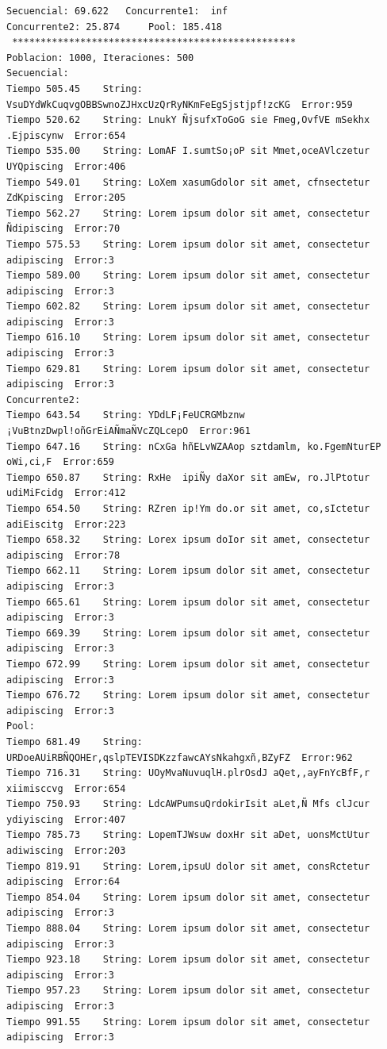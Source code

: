 \documentclass[a4paper,twocolumn,10pt]{article}
\begin{document}
\begin{center}
{\begin{verbatim}
Secuencial: 69.622	 Concurrente1:  inf
Concurrente2: 25.874	 Pool: 185.418 
 **************************************************
Poblacion: 1000, Iteraciones: 500
Secuencial:
Tiempo 505.45	 String: VsuDYdWkCuqvgOBBSwnoZJHxcUzQrRyNKmFeEgSjstjpf!zcKG	 Error:959
Tiempo 520.62	 String: LnukY ÑjsufxToGoG sie Fmeg,OvfVE mSekhx .Ejpiscynw	 Error:654
Tiempo 535.00	 String: LomAF I.sumtSo¡oP sit Mmet,oceAVlczetur UYQpiscing	 Error:406
Tiempo 549.01	 String: LoXem xasumGdolor sit amet, cfnsectetur ZdKpiscing	 Error:205
Tiempo 562.27	 String: Lorem ipsum dolor sit amet, consectetur Ñdipiscing	 Error:70
Tiempo 575.53	 String: Lorem ipsum dolor sit amet, consectetur adipiscing	 Error:3
Tiempo 589.00	 String: Lorem ipsum dolor sit amet, consectetur adipiscing	 Error:3
Tiempo 602.82	 String: Lorem ipsum dolor sit amet, consectetur adipiscing	 Error:3
Tiempo 616.10	 String: Lorem ipsum dolor sit amet, consectetur adipiscing	 Error:3
Tiempo 629.81	 String: Lorem ipsum dolor sit amet, consectetur adipiscing	 Error:3
Concurrente2:
Tiempo 643.54	 String: YDdLF¡FeUCRGMbznw ¡VuBtnzDwpl!oñGrEiAÑmaÑVcZQLcepO	 Error:961
Tiempo 647.16	 String: nCxGa hñELvWZAAop sztdamlm, ko.FgemNturEP oWi,ci,F	 Error:659
Tiempo 650.87	 String: RxHe  ipiÑy daXor sit amEw, ro.JlPtotur udiMiFcidg	 Error:412
Tiempo 654.50	 String: RZren ip!Ym do.or sit amet, co,sIctetur adiEiscitg	 Error:223
Tiempo 658.32	 String: Lorex ipsum doIor sit amet, consectetur adipiscing	 Error:78
Tiempo 662.11	 String: Lorem ipsum dolor sit amet, consectetur adipiscing	 Error:3
Tiempo 665.61	 String: Lorem ipsum dolor sit amet, consectetur adipiscing	 Error:3
Tiempo 669.39	 String: Lorem ipsum dolor sit amet, consectetur adipiscing	 Error:3
Tiempo 672.99	 String: Lorem ipsum dolor sit amet, consectetur adipiscing	 Error:3
Tiempo 676.72	 String: Lorem ipsum dolor sit amet, consectetur adipiscing	 Error:3
Pool:
Tiempo 681.49	 String: URDoeAUiRBÑQOHEr,qslpTEVISDKzzfawcAYsNkahgxñ,BZyFZ	 Error:962
Tiempo 716.31	 String: UOyMvaNuvuqlH.plrOsdJ aQet,,ayFnYcBfF,r xiimisccvg	 Error:654
Tiempo 750.93	 String: LdcAWPumsuQrdokirIsit aLet,Ñ Mfs clJcur ydiyiscing	 Error:407
Tiempo 785.73	 String: LopemTJWsuw doxHr sit aDet, uonsMctUtur adiwiscing	 Error:203
Tiempo 819.91	 String: Lorem,ipsuU dolor sit amet, consRctetur adipiscing	 Error:64
Tiempo 854.04	 String: Lorem ipsum dolor sit amet, consectetur adipiscing	 Error:3
Tiempo 888.04	 String: Lorem ipsum dolor sit amet, consectetur adipiscing	 Error:3
Tiempo 923.18	 String: Lorem ipsum dolor sit amet, consectetur adipiscing	 Error:3
Tiempo 957.23	 String: Lorem ipsum dolor sit amet, consectetur adipiscing	 Error:3
Tiempo 991.55	 String: Lorem ipsum dolor sit amet, consectetur adipiscing	 Error:3


\end{verbatim}}
\end{center}
\end{document}
